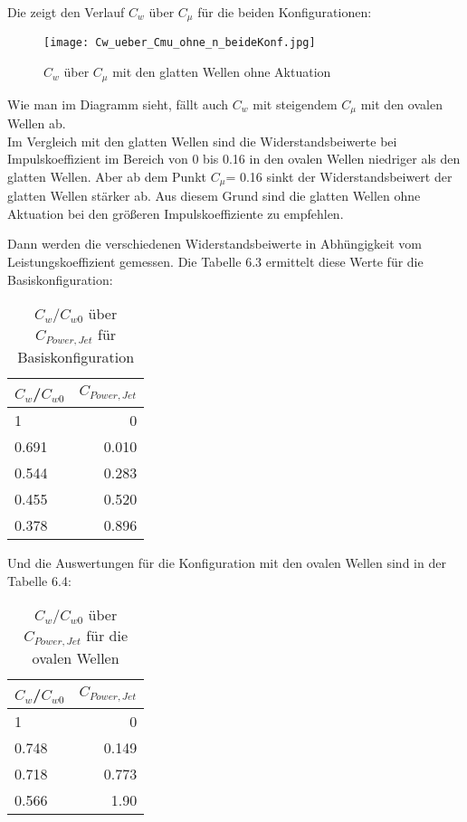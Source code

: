 Die  zeigt den Verlauf $C_{w}$ \"uber $C_{\mu}$ f\"ur die beiden Konfigurationen:
\begin{figure}[h]
	\centering
	\texttt{[image: Cw\_ueber\_Cmu\_ohne\_n\_beideKonf.jpg]}
	\caption{$C_{w}$  \"uber $C_{\mu}$ mit den glatten Wellen ohne Aktuation }
	\label{fig:Cw-Cmu_Konf1+2}
\end{figure}

Wie man im Diagramm sieht, f\"allt auch $C_{w}$  mit steigendem $C_{\mu}$  mit den ovalen Wellen ab.
\\
Im Vergleich mit den glatten Wellen sind die Widerstandsbeiwerte bei Impulskoeffizient im Bereich von 0 bis 0.16  in den ovalen Wellen niedriger als den glatten Wellen. Aber ab dem Punkt $C_{\mu}$= 0.16 sinkt der Widerstandsbeiwert der glatten Wellen st\"arker ab. Aus diesem Grund sind die glatten Wellen ohne Aktuation bei den gr\"o\ss{}eren Impulskoeffiziente zu empfehlen.

Dann werden die verschiedenen Widerstandsbeiwerte in Abh\"ungigkeit vom Leistungskoeffizient gemessen. Die Tabelle 6.3 ermittelt diese Werte f\"ur die Basiskonfiguration:
\begin{table}[h]
	\centering
	\begin{tabular}{lr}
		\toprule
		$C_{w}$/$C_{w0}$ & $C_{Power,Jet}$ \\
		\midrule
		1 & 0\\
		0.691 & 0.010\\
		0.544 & 0.283\\
		0.455 & 0.520\\
		0.378 & 0.896\\
		\bottomrule
	\end{tabular}
	\caption{$C_{w}$/$C_{w0}$ \"uber $C_{Power,Jet}$ f\"ur Basiskonfiguration }
	\label{tab:Cw/Cw0-CpJet_Kon1}
\end{table}

Und die Auswertungen f\"ur die Konfiguration mit den ovalen Wellen sind in der Tabelle 6.4:

\begin{table}[h]
	\centering
	\begin{tabular}{lr}
		\toprule
		$C_{w}$/$C_{w0}$ & $C_{Power,Jet}$ \\
		\midrule
		1 & 0\\
		0.748 & 0.149\\
		0.718 & 0.773\\
		0.566 & 1.90\\
		\bottomrule
	\end{tabular}
	\caption{$C_{w}$/$C_{w0}$ \"uber $C_{Power,Jet}$ f\"ur die ovalen Wellen }
	\label{tab:Cw/Cw0-CpJet_Kon2}
\end{table}

